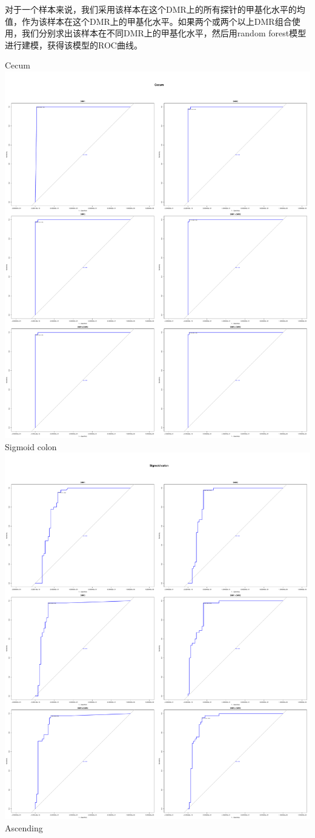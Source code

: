 \documentclass[openany]{book}
\begin{document}
对于一个样本来说，我们采用该样本在这个DMR上的所有探针的甲基化水平的均值，作为该样本在这个DMR上的甲基化水平。如果两个或两个以上DMR组合使用，我们分别求出该样本在不同DMR上的甲基化水平，然后用random
forest模型进行建模，获得该模型的ROC曲线。

Cecum\includegraphics{book1_files/figure-latex/plots-1.pdf} Sigmoid
colon\includegraphics{book1_files/figure-latex/plots-2.pdf} Ascending
\end{document}
